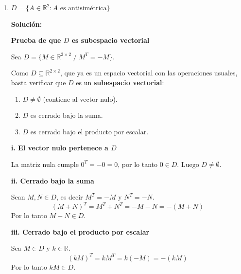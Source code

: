 \documentclass[12pt]{article}
\newcommand{\solucion}{%
    \vspace{0.8em}%
    \textbf{Solución:}%
    \vspace{0.8em}%
}
\begin{document}
\begin{enumerate}[label=\alph*.-]
    Separamos según los parámetros libres $a_1$ y $a_2$:
    \[
    p(x) = a_1(-1+x) + a_2(-1+x^2) = a_1(x-1)+a_2(x^2-1)
    \]

    Es decir, todo polinomio de $C$ se escribe como combinación lineal de $p_1(x)=x-1$ y $p_2(x)=x^2-1$. Por lo tanto:
    \[
    C = \operatorname{gen}\{x-1,\; x^2-1\}
    \]

    Además, $p_1$ y $p_2$ son linealmente independientes, pues tienen distinto grado (ninguno es múltiplo escalar del otro): si $\alpha(x-1)+\beta(x^2-1)=0$ para todo $x$, comparando coeficientes se obtiene $\beta=0$ (coef. de $x^2$), $\alpha=0$ (coef. de $x$).

    \textbf{Conclusión:}
    \[
    \text{Base de } C = \{x-1,\; x^2-1\}, \qquad \dim(C) = 2.
    \]

    \item $D = \{A \in \mathbb{R}^2 : A \text{ es antisimétrica}\}$

    \solucion

    \textbf{Prueba de que $D$ es subespacio vectorial}

    Sea $D = \{M \in \mathbb{R}^{2\times2} \; / \; M^T=-M\}$.

    Como $D \subseteq \mathbb{R}^{2\times2}$, que ya es un espacio vectorial con las operaciones usuales, basta verificar que $D$ es un \textbf{subespacio vectorial}:

    \begin{enumerate}
        \item[i.] $D \neq \emptyset$ (contiene al vector nulo).
        \item[ii.] $D$ es cerrado bajo la suma.
        \item[iii.] $D$ es cerrado bajo el producto por escalar.
    \end{enumerate}

    \textbf{i. El vector nulo pertenece a $D$}

    La matriz nula cumple $0^T=-0=0$, por lo tanto $0 \in D$. Luego $D \neq \emptyset$.

    \textbf{ii. Cerrado bajo la suma}

    Sean $M,N \in D$, es decir $M^T=-M$ y $N^T=-N$.
    \[
    (M+N)^T = M^T+N^T = -M-N = -(M+N)
    \]
    Por lo tanto $M+N \in D$.

    \textbf{iii. Cerrado bajo el producto por escalar}

    Sea $M \in D$ y $k \in \mathbb{R}$.
    \[
    (kM)^T = kM^T = k(-M) = -(kM)
    \]
    Por lo tanto $kM \in D$.


\end{enumerate}
\end{document}
